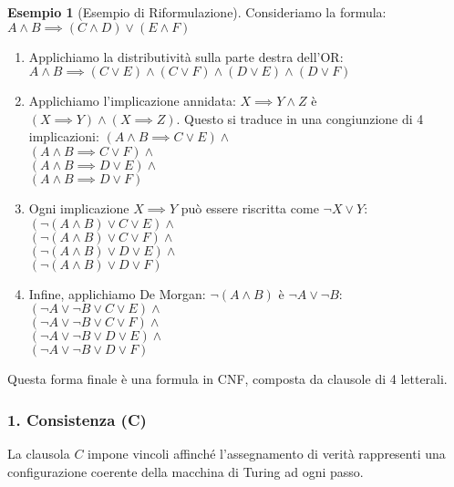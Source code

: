 \documentclass[a4paper]{article}
\theoremstyle{definition} %
\newtheorem{example}{Esempio}
\begin{document}
\begin{example}[Esempio di Riformulazione]
Consideriamo la formula: $A \land B \implies (C \land D) \lor (E \land F)$
\begin{enumerate}
    \item Applichiamo la distributività sulla parte destra dell'OR:
    $A \land B \implies (C \lor E) \land (C \lor F) \land (D \lor E) \land (D \lor F)$
    \item Applichiamo l'implicazione annidata: $X \implies Y \land Z$ è $(X \implies Y) \land (X \implies Z)$.
    Questo si traduce in una congiunzione di 4 implicazioni:
    $(A \land B \implies C \lor E) \land$ \\
    $(A \land B \implies C \lor F) \land$ \\
    $(A \land B \implies D \lor E) \land$ \\
    $(A \land B \implies D \lor F)$
    \item Ogni implicazione $X \implies Y$ può essere riscritta come $\neg X \lor Y$:
    $(\neg (A \land B) \lor C \lor E) \land$ \\
    $(\neg (A \land B) \lor C \lor F) \land$ \\
    $(\neg (A \land B) \lor D \lor E) \land$ \\
    $(\neg (A \land B) \lor D \lor F)$
    \item Infine, applichiamo De Morgan: $\neg (A \land B)$ è $\neg A \lor \neg B$:
    $(\neg A \lor \neg B \lor C \lor E) \land$ \\
    $(\neg A \lor \neg B \lor C \lor F) \land$ \\
    $(\neg A \lor \neg B \lor D \lor E) \land$ \\
    $(\neg A \lor \neg B \lor D \lor F)$
\end{enumerate}
Questa forma finale è una formula in CNF, composta da clausole di 4 letterali.
\end{example}

\subsubsection{1. Consistenza (C)}
La clausola $C$ impone vincoli affinché l'assegnamento di verità rappresenti una configurazione coerente della macchina di Turing ad ogni passo.
\end{document}
